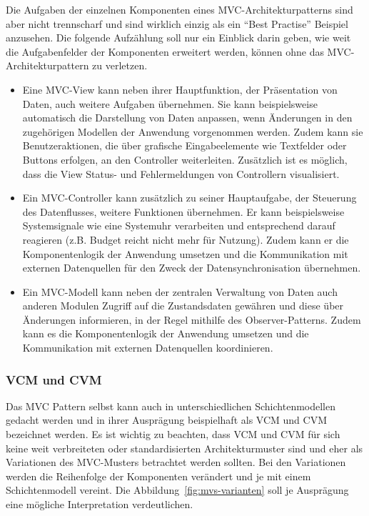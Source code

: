 \documentclass[../vs-script-first-v01.tex]{subfiles}
\begin{document}
Die Aufgaben der einzelnen Komponenten eines MVC-Architekturpatterns sind aber nicht trennscharf und sind wirklich einzig als ein \enquote{Best Practise} Beispiel anzusehen. Die folgende Aufzählung soll nur ein Einblick darin geben, wie weit die Aufgabenfelder der Komponenten erweitert werden, können ohne das MVC-Architekturpattern zu verletzen. 
\begin{itemize}
\item Eine MVC-View kann neben ihrer Hauptfunktion, der Präsentation von Daten, auch weitere Aufgaben übernehmen. Sie kann beispielsweise automatisch die Darstellung von Daten anpassen, wenn Änderungen in den zugehörigen Modellen der Anwendung vorgenommen werden. Zudem kann sie Benutzeraktionen, die über grafische Eingabeelemente wie Textfelder oder Buttons erfolgen, an den Controller weiterleiten. Zusätzlich ist es möglich, dass die View Status- und Fehlermeldungen von Controllern visualisiert.

\item Ein MVC-Controller kann zusätzlich zu seiner Hauptaufgabe, der Steuerung des Datenflusses, weitere Funktionen übernehmen. Er kann beispielsweise Systemsignale wie eine Systemuhr verarbeiten und entsprechend darauf reagieren (z.B. Budget reicht nicht mehr für Nutzung). Zudem kann er die Komponentenlogik der Anwendung umsetzen und die Kommunikation mit externen Datenquellen für den Zweck der Datensynchronisation übernehmen.

\item Ein MVC-Modell kann neben der zentralen Verwaltung von Daten auch anderen Modulen Zugriff auf die Zustandsdaten gewähren und diese über Änderungen informieren, in der Regel mithilfe des Observer-Patterns. Zudem kann es die Komponentenlogik der Anwendung umsetzen und die Kommunikation mit externen Datenquellen koordinieren.
\end{itemize}

\subsubsection{VCM und CVM}
Das MVC Pattern selbst kann auch in unterschiedlichen Schichtenmodellen gedacht werden und in ihrer Ausprägung beispielhaft als VCM und CVM bezeichnet werden.  Es ist wichtig zu beachten, dass VCM und CVM für sich keine weit verbreiteten oder standardisierten Architekturmuster sind und eher als Variationen des MVC-Musters betrachtet werden sollten. Bei den Variationen werden die Reihenfolge der Komponenten verändert und je mit einem Schichtenmodell vereint. Die Abbildung~\ref{fig:mvs-varianten} soll je Ausprägung eine mögliche Interpretation verdeutlichen.
\end{document}
